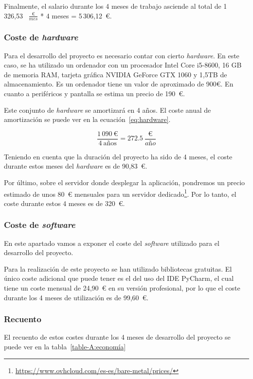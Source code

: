 Finalmente, el salario durante los 4 meses de trabajo asciende al total de 1\,326,53~ $\frac{\text{€}}{mes}$ * 4 meses = 5\,306,12~€.


\subsubsection{Coste de \textit{hardware}}
Para el desarrollo del proyecto es necesario contar con cierto \textit{hardware}.
En este caso, se ha utilizado un ordenador con un procesador Intel Core i5-8600, 16 GB de memoria RAM, tarjeta gráfica NVIDIA GeForce GTX 1060 y 1,5TB de almacenamiento.
Es un ordenador tiene un valor de aproximado de 900€. En cuanto a periféricos y pantalla se estima un precio de 190~€.

Este conjunto de \textit{hardware} se amortizará en 4 años. El coste anual de amortización se puede ver en la ecuación~\ref{eq:hardware}.

\begin{equation}\label{eq:hardware}
\frac{1\,090~\text{€}}{4~\text{años}} = 272.5~\frac{\text{€}}{año}
\end{equation}

Teniendo en cuenta que la duración del proyecto ha sido de 4 meses, el coste durante estos meses del \textit{hardware} es de 90,83~€.

Por último, sobre el servidor donde desplegar la aplicación, pondremos un precio estimado de unos 80~€ mensuales para un servidor dedicado\footnote{\url{https://www.ovhcloud.com/es-es/bare-metal/prices/}}. Por lo tanto, el coste durante estos 4 meses es de 320~€.

\subsubsection{Coste de \textit{software}}
En este apartado vamos a exponer el coste del \textit{software} utilizado para el desarrollo del proyecto.

Para la realización de este proyecto se han utilizado bibliotecas gratuitas. 
El único coste adicional que puede tener es el del uso del IDE PyCharm, el cual tiene un coste mensual de 24,90~€ en su versión profesional, por lo que el coste durante los 4 meses de utilización es de 99,60~€.

\subsubsection{Recuento}
El recuento de estos costes durante los 4 meses de desarrollo del proyecto se puede ver en la tabla~\ref{table-A:economía}

